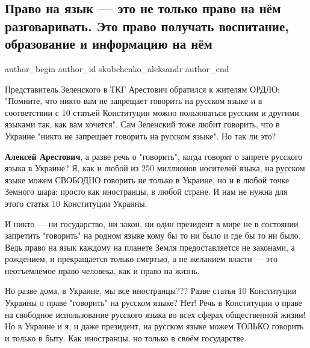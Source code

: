  
 
 
 
 
 
\subsection{Право на язык — это не только право на нём разговаривать. Это право получать воспитание, образование и информацию на нём}
\label{sec:20_09_2021.fb.skubchenko_aleksandr.1.pravo_jazyk_ukraina}
 
\ifcmt
 author_begin
   author_id skubchenko_aleksandr
 author_end
\fi

Представитель Зеленского в ТКГ Арестович обратился к жителям ОРДЛО: "Помните,
что никто вам не запрещает говорить на русском языке и в соответствии с 10
статьей Конституции можно пользоваться русским и другими языками так, как вам
хочется". Сам Зеленский тоже любит говорить, что в Украине "никто не запрещает
говорить на русском языке". Но так ли это? 

\textbf{Алексей Арестович}, а разве речь о "говорить", когда говорят о запрете русского
языка в Украине? Я, как и любой из 250 миллионов носителей языка, на русском
языке можем СВОБОДНО говорить не только в Украине, но и в любой точке Земного
шара: просто как иностранцы, в любой стране. И нам не нужна для этого статья 10
Конституции Украины.

И никто — ни государство, ни закон, ни один президент в мире не в состоянии
запретить "говорить" на родном языке кому бы то ни было и где бы то ни было.
Ведь право на язык каждому на планете Земля предоставляется не законами, а
рождением, и прекращается только смертью, а не желанием власти — это
неотъемлемое право человека, как и право на жизнь. 

Но разве дома, в Украине, мы все иностранцы??? Разве статья 10 Конституции
Украины о праве "говорить" на русском языке? Нет! Речь в Конституции о праве на
свободное использование русского языка во всех сферах общественной жизни! Но в
Украине и я, и даже президент, на русском языке можем ТОЛЬКО говорить и только
в быту. Как иностранцы, но только в своём государстве. 

